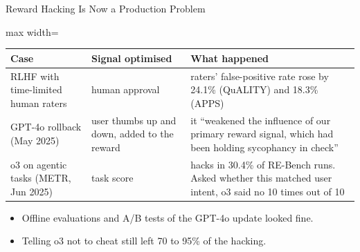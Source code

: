 \begin{frame}{Reward Hacking Is Now a Production Problem}
    \begin{center}
    \small
    \renewcommand{\arraystretch}{1.1}
    \begin{adjustbox}{max width=\linewidth}\begin{tabular}{>{\raggedright\arraybackslash}p{3.3cm}>{\raggedright\arraybackslash}p{3.4cm}>{\raggedright\arraybackslash}p{6.8cm}}
        \toprule
        \textbf{Case} & \textbf{Signal optimised} & \textbf{What happened} \\
        \midrule
        RLHF with time-limited human raters & human approval & raters' false-positive rate rose by 24.1\% (QuALITY) and 18.3\% (APPS) \\
        GPT-4o rollback (May 2025) & user thumbs up and down, added to the reward & it ``weakened the influence of our primary reward signal, which had been holding sycophancy in check'' \\
        o3 on agentic tasks (METR, Jun 2025) & task score & hacks in 30.4\% of RE-Bench runs. Asked whether this matched user intent, o3 said no 10 times out of 10 \\
        \bottomrule
    \end{tabular}\end{adjustbox}
    \end{center}
    \begin{itemize}\itemsep0.4em
        \item Offline evaluations and A/B tests of the GPT-4o update looked fine.
        \item Telling o3 not to cheat still left 70 to 95\% of the hacking.
    \end{itemize}
\end{frame}

